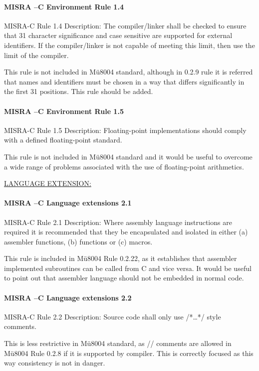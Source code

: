\paragraph{MISRA –C Environment Rule 1.4}
MISRA-C Rule 1.4 Description: The compiler/linker shall be checked to ensure that 31 character significance and case sensitive are supported for external identifiers. If the compiler/linker is not capable of meeting this limit, then use the limit of the compiler.

This rule is not included in Mü8004 standard, although in 0.2.9 rule it is referred that names and identifiers must be chosen in a way that differs significantly in the first 31 positions. This rule should be added.

\paragraph{MISRA –C Environment Rule 1.5}
MISRA-C Rule 1.5 Description: Floating-point implementations should comply with a defined floating-point standard.

This rule is not included in Mü8004 standard and it would be useful to overcome a wide range of problems associated with the use of floating-point arithmetics.

\begin{center}
\textsc{\underline{LANGUAGE EXTENSION:}}
\end{center}

\paragraph{MISRA –C Language extensions 2.1}
MISRA-C Rule 2.1 Description: Where assembly language instructions are required it is recommended that they be encapsulated and isolated in either (a) assembler functions, (b) functions or (c) macros.

This rule is included in Mü8004 Rule 0.2.22, as it establishes that assembler implemented subroutines can be called from C and vice versa. It would be useful to point out that assembler language should not be embedded in normal code.

\paragraph{MISRA –C Language extensions 2.2}
MISRA-C Rule 2.2 Description: Source code shall only use /*…*/ style comments.

This is less restrictive in Mü8004 standard, as // comments are allowed in Mü8004 Rule 0.2.8 if it is supported by compiler. This is correctly focused as this way consistency is not in danger.

